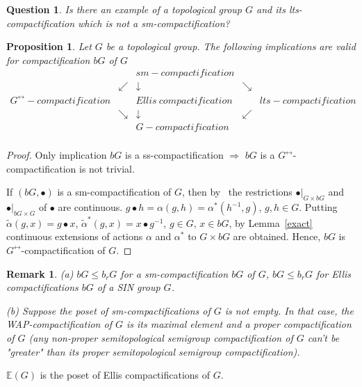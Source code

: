 \documentclass{amsart}
\newtheorem{pro}[thm]{Proposition}
\newtheorem{que}[thm]{Question}
\newtheorem{rem}[thm]{Remark}
\begin{document}
\begin{que}
Is there an example of a topological group $G$ and its lts-compactification which is not a sm-compactification?
\end{que}

\begin{pro}\label{compsg}
Let $G$ be a topological group. The following implications are valid for compactification $b G$ of $G$
 $$\begin{array}{ccccc}
 &  & sm-compactification  &  &   \\ 
&  \swarrow & \downarrow   & \searrow &   \\
G^{\leftrightarrow}-compactification & & Ellis\ compactification  &   & lts-compactification \\
&  \searrow & \downarrow   &  \swarrow  &   \\
& & G{-}compactification  &    &  \\
\end{array}
$$
\end{pro}

\begin{proof}
Only implication $b G$ is a ss-compactification $\Longrightarrow$ $b G$ is a $G^{\leftrightarrow}$-compactification is not trivial.

If $(b G, \bullet)$ is a sm-compactification of $G$, then by~\cite[Propositions 6.1, 6.2]{JLawson} the restrictions $\bullet|_{G\times b G}$ and $\bullet|_{b G\times G}$ of $\bullet$ are continuous. $g\bullet h=\alpha (g, h)=\alpha^* (h^{-1}, g)$, $g, h\in G$. Putting $\tilde\alpha (g, x)=g\bullet x$, $\tilde{\alpha}^*(g, x)=x\bullet g^{-1}$, $g\in G$, $x\in b G$, by Lemma~\ref{exact} continuous extensions of actions $\alpha$ and $\alpha^*$ to $G\times b G$ are obtained. Hence, $b G$ is $G^{\leftrightarrow}$-compactification of $G$. 
\end{proof}

\begin{rem}
{\rm (a) $b G\leq b_r G$ for a sm-compactification $b G$ of $G$, $b G\leq b_r G$ for Ellis compactifications $b G$ of a SIN group $G$.

(b) Suppose the poset of sm-compactifications of $G$ is not empty. In that case, the WAP-compactification of $G$ is its maximal element and a proper compactification of $G$ (any non-proper semitopological semigroup compactification of $G$ can't be "greater" than its proper semitopological semigroup compactification).}
\end{rem}

$\mathbb{E} (G)$ is the poset of Ellis compactifications of $G$.
\end{document}
